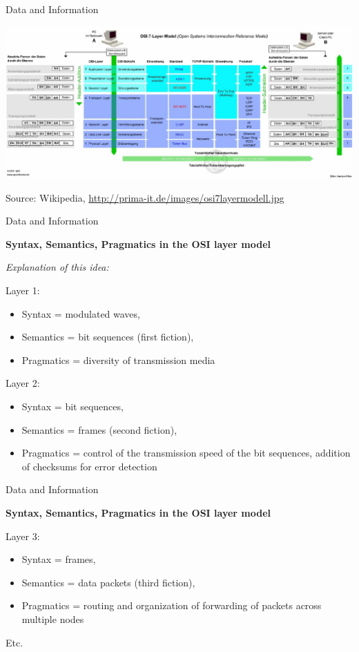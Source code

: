 \documentclass{beamer}
\newcommand{\ueberschrift}[1]{\begin{center}\bf #1\end{center}}
\begin{document}
\begin{frame}{Data and Information}
  \begin{center}
    \includegraphics[width=\textwidth]{Rqw330.jpg}
  \end{center}
Source: Wikipedia, \url{http://prima-it.de/images/osi7layermodell.jpg}
\end{frame}
\begin{frame}{Data and Information}

  \ueberschrift{Syntax, Semantics, Pragmatics in the OSI layer model}

\emph{Explanation of this idea:}

Layer 1: 
\begin{itemize}
\item Syntax = modulated waves,
\item Semantics = bit sequences (first fiction), 
\item Pragmatics = diversity of transmission media
\end{itemize}
Layer 2: 
\begin{itemize}
\item Syntax = bit sequences, 
\item Semantics = frames (second fiction),
\item Pragmatics = control of the transmission speed of the bit sequences,
  addition of checksums for error detection
\end{itemize}\vspace*{2em}
\end{frame}
\begin{frame}{Data and Information}

  \ueberschrift{Syntax, Semantics, Pragmatics in the OSI layer model}

Layer 3: 
\begin{itemize}
\item Syntax = frames, 
\item Semantics = data packets (third fiction),
\item Pragmatics = routing and organization of forwarding of packets across
  multiple nodes
\end{itemize}
Etc.\vfill
\end{frame}
\end{document}
